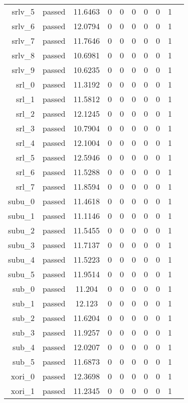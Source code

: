 \begin{longtable}{r|ccccccccc}
    srlv\_5 & passed & 11.6463 & 0 & 0 & 0 & 0 & 0 & 1 \\
    srlv\_6 & passed & 12.0794 & 0 & 0 & 0 & 0 & 0 & 1 \\
    srlv\_7 & passed & 11.7646 & 0 & 0 & 0 & 0 & 0 & 1 \\
    srlv\_8 & passed & 10.6981 & 0 & 0 & 0 & 0 & 0 & 1 \\
    srlv\_9 & passed & 10.6235 & 0 & 0 & 0 & 0 & 0 & 1 \\
    srl\_0 & passed & 11.3192 & 0 & 0 & 0 & 0 & 0 & 1 \\
    srl\_1 & passed & 11.5812 & 0 & 0 & 0 & 0 & 0 & 1 \\
    srl\_2 & passed & 12.1245 & 0 & 0 & 0 & 0 & 0 & 1 \\
    srl\_3 & passed & 10.7904 & 0 & 0 & 0 & 0 & 0 & 1 \\
    srl\_4 & passed & 12.1004 & 0 & 0 & 0 & 0 & 0 & 1 \\
    srl\_5 & passed & 12.5946 & 0 & 0 & 0 & 0 & 0 & 1 \\
    srl\_6 & passed & 11.5288 & 0 & 0 & 0 & 0 & 0 & 1 \\
    srl\_7 & passed & 11.8594 & 0 & 0 & 0 & 0 & 0 & 1 \\
    subu\_0 & passed & 11.4618 & 0 & 0 & 0 & 0 & 0 & 1 \\
    subu\_1 & passed & 11.1146 & 0 & 0 & 0 & 0 & 0 & 1 \\
    subu\_2 & passed & 11.5455 & 0 & 0 & 0 & 0 & 0 & 1 \\
    subu\_3 & passed & 11.7137 & 0 & 0 & 0 & 0 & 0 & 1 \\
    subu\_4 & passed & 11.5223 & 0 & 0 & 0 & 0 & 0 & 1 \\
    subu\_5 & passed & 11.9514 & 0 & 0 & 0 & 0 & 0 & 1 \\
    sub\_0 & passed & 11.204 & 0 & 0 & 0 & 0 & 0 & 1 \\
    sub\_1 & passed & 12.123 & 0 & 0 & 0 & 0 & 0 & 1 \\
    sub\_2 & passed & 11.6204 & 0 & 0 & 0 & 0 & 0 & 1 \\
    sub\_3 & passed & 11.9257 & 0 & 0 & 0 & 0 & 0 & 1 \\
    sub\_4 & passed & 12.0207 & 0 & 0 & 0 & 0 & 0 & 1 \\
    sub\_5 & passed & 11.6873 & 0 & 0 & 0 & 0 & 0 & 1 \\
    xori\_0 & passed & 12.3698 & 0 & 0 & 0 & 0 & 0 & 1 \\
    xori\_1 & passed & 11.2345 & 0 & 0 & 0 & 0 & 0 & 1 \\

\end{longtable}
